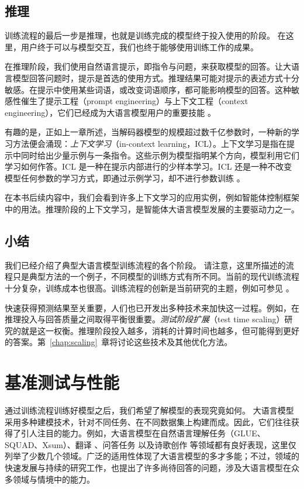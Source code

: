 \subsection{推理}
训练流程的最后一步是推理，也就是训练完成的模型终于投入使用的阶段。
在这里，用户终于可以与模型交互，我们也终于能够使用训练工作的成果。

在推理阶段，我们使用自然语言提示，即指令与问题，来获取模型的回答。让大语言模型回答问题时，提示是首选的使用方式。推理结果可能对提示的表述方式十分敏感。在提示中使用某些词语，或改变词语顺序，都可能影响模型的回答。这种敏感性催生了提示工程（prompt engineering）与上下文工程（context engineering），它们已经成为大语言模型用户的重要技能 \citep{sahoo2024systematic}。

有趣的是，正如上一章所述，当解码器模型的规模超过数千亿参数时，一种新的学习方法便会涌现：{\em 上下文学习}（in-context learning，ICL）\citep{brown2020language,wei2022emergent}。上下文学习是指在提示中同时给出少量示例与一条指令。这些示例为模型指明某个方向，模型利用它们学习如何作答。ICL 是一种在提示内部进行的少样本学习。ICL 还是一种不改变模型任何参数的学习方式，即通过示例学习，却不进行参数训练 \citep{dong2022survey}。

在本书后续内容中，我们会看到许多上下文学习的应用实例，例如智能体控制框架中的用法。推理阶段的上下文学习，是智能体大语言模型发展的主要驱动力之一。

\subsection{小结}
我们已经介绍了典型大语言模型训练流程的各个阶段。
请注意，这里所描述的流程只是典型方法的一个例子，不同模型的训练方式有所不同。当前的现代训练流程十分复杂，训练成本也很高。训练流程的创新是当前研究的主题，例如可参见 \citet{guo2025deepseek,team2025kimi}。

快速获得预测结果至关重要，人们也已开发出多种技术来加快这一过程。例如，在推理投入与回答质量之间取得平衡很重要。{\em 测试阶段扩展}（test time scaling）研究的就是这一权衡。推理阶段投入越多，消耗的计算时间也越多，但可能得到更好的答案。第~\ref{chap:scaling}~章将讨论这些技术及其他优化方法。

\section{基准测试与性能}
\label{sec:pipeline-benchmarks}
通过训练流程训练好模型之后，我们希望了解模型的表现究竟如何。
大语言模型采用多种建模技术，针对不同任务、在不同数据集上构建而成。因此，它们往往获得了引人注目的能力。例如，大语言模型在自然语言理解任务（GLUE、SQUAD、Xsum）\citep{wang2018glue,wang2019superglue,rajpurkar2016squad,narayan2018don}、翻译 \citep{kocmi2022findings,papineni2002bleu,sennrich2015improving}、问答任务 \citep{roberts2020much} 以及诗歌创作 \citep{zhang2024llm} 等领域都有良好表现，这里仅列举了少数几个领域。广泛的适用性体现了大语言模型的多才多能；不过，领域的快速发展与持续的研究工作，也提出了许多尚待回答的问题，涉及大语言模型在众多领域与情境中的能力。

